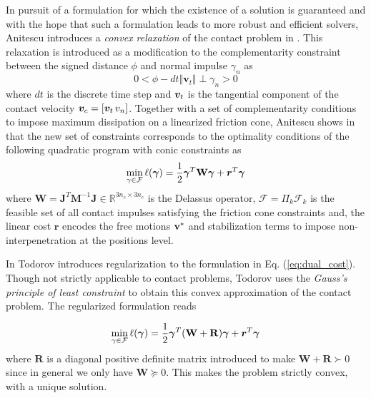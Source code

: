 In pursuit of a formulation for which the existence of a solution is guaranteed
and with the hope that such a formulation leads to more robust and efficient
solvers, Anitescu introduces a \textit{convex relaxation} of the contact problem in
\cite{bib:anitescu2006}. This relaxation is introduced as a modification to the
complementarity constraint between the signed distance $\phi$ and normal impulse
$\gamma_n$ as
\begin{equation}
	0 < \phi - dt \Vert {\bm v}_t \Vert \perp \gamma_n > 0
	\label{eq:convex_relaxation_complementarity_condition}
\end{equation}
where $dt$ is the discrete time step and ${\bm{v}}_t$ is the tangential component
of the contact velocity ${\bm{v}}_c = [{\bm{v}}_t\,v_n]$. Together with a set of
complementarity conditions to impose maximum dissipation on a linearized
friction cone, Anitescu shows in \cite{bib:anitescu2006} that the new set of
constraints corresponds to the optimality conditions of the following quadratic
program with conic constraints as
\begin{eqnarray}
	\min_{\gamma\in \mathcal{F}} \ell(\bgamma) =
	\frac{1}{2}\bgamma^T\mathbf{W}\bgamma + {\bm r}^T
	\bgamma
	\label{eq:dual_cost}
\end{eqnarray}
where $\mathbf{W} =
\mathbf{J}^T\mathbf{M}^{-1}\mathbf{J}\in\mathbb{R}^{3n_c\times 3n_c}$ is the
Delassus operator, $\mathcal{F} = \Pi_k \mathcal{F}_k$ is the feasible set of
all contact impulses satisfying the friction cone constraints and, the linear
cost ${\bm r}$ encodes the free motions ${\mathbf{v}}^*$ and stabilization terms to
impose non-interpenetration at the positions level.

In \cite{bib:todorov2011, bib:todorov2014} Todorov introduces regularization to
the formulation in Eq. (\ref{eq:dual_cost}). Though not strictly applicable to
contact problems, Todorov uses the \textit{Gauss's principle of least
constraint} to obtain this convex approximation of the contact problem. The
regularized formulation reads

\begin{eqnarray}
	\min_{\gamma\in \mathcal{F}} \ell(\bgamma) =
	\frac{1}{2}\bgamma^T(\mathbf{W}+\mathbf{R})\bgamma + {\bm r}^T
	\bgamma
	\label{eq:dual_regularized}
\end{eqnarray}
where $\mathbf{R}$ is a diagonal positive definite matrix introduced to
make $\mathbf{W}+\mathbf{R}\succ 0$ since in general we only have $\mathbf{W}
\succeq 0$. This makes the problem strictly convex, with a unique solution. 

